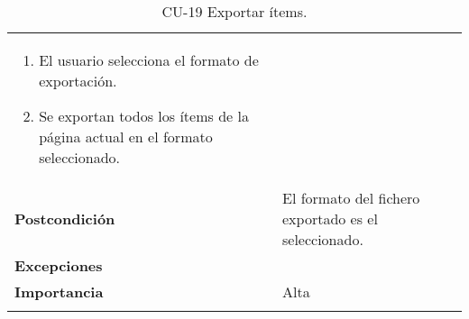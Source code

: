 \begin{longtable}[]{@{}ll@{}}
\begin{minipage}[t]{0.71\columnwidth}
\begin{enumerate}
\tightlist
\item
  El usuario selecciona el formato de exportación.
\item
  Se exportan todos los ítems de la página actual en el formato
  seleccionado.
\end{enumerate}\strut
\end{minipage}\tabularnewline
\begin{minipage}[t]{0.23\columnwidth}\raggedright
\textbf{Postcondición}\strut
\end{minipage} & \begin{minipage}[t]{0.71\columnwidth}\raggedright
El formato del fichero exportado es el seleccionado.\strut
\end{minipage}\tabularnewline
\begin{minipage}[t]{0.23\columnwidth}\raggedright
\textbf{Excepciones}\strut
\end{minipage} & \begin{minipage}[t]{0.71\columnwidth}\raggedright
\strut
\end{minipage}\tabularnewline
\begin{minipage}[t]{0.23\columnwidth}\raggedright
\textbf{Importancia}\strut
\end{minipage} & \begin{minipage}[t]{0.71\columnwidth}\raggedright
Alta\strut
\end{minipage}\tabularnewline
\bottomrule
\caption{CU-19 Exportar ítems.}
\end{longtable}

